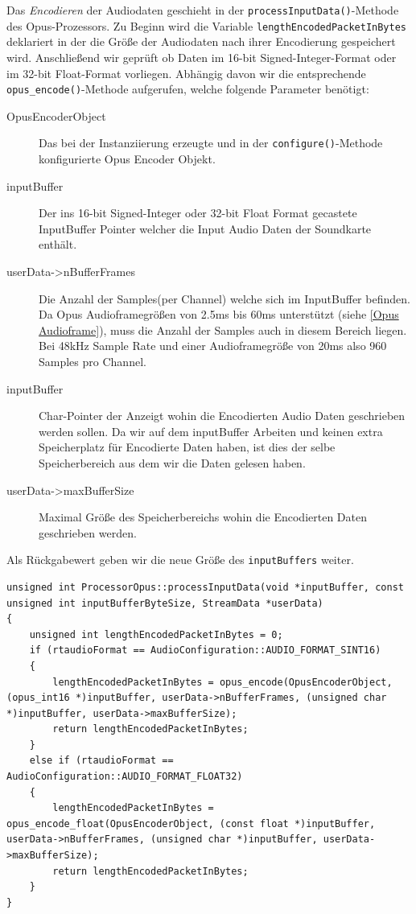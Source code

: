 Das \textit{Encodieren} der Audiodaten geschieht in der \texttt{processInputData()}-Methode des Opus-Prozessors. Zu Beginn wird die Variable \texttt{lengthEncodedPacketInBytes} deklariert in der die Größe der Audiodaten nach ihrer Encodierung gespeichert wird. Anschließend wir geprüft ob Daten im 16-bit Signed-Integer-Format oder im 32-bit Float-Format vorliegen.
Abhängig davon wir die entsprechende \texttt{opus\_encode()}-Methode aufgerufen, welche folgende Parameter benötigt:

\begin{description}
\item[OpusEncoderObject] Das bei der Instanziierung erzeugte und in der \texttt{configure()}-Methode konfigurierte Opus Encoder Objekt.
\item[inputBuffer] Der ins 16-bit Signed-Integer oder 32-bit Float Format gecastete InputBuffer Pointer welcher die Input Audio Daten der Soundkarte enthält.
\item[userData->nBufferFrames] Die Anzahl der Samples(per Channel) welche sich im InputBuffer befinden. Da Opus Audioframegrößen von 2.5ms bis 60ms unterstützt (siehe \ref{Opus Audioframe}), muss die Anzahl der Samples auch in diesem Bereich liegen. Bei 48kHz Sample Rate und einer Audioframegröße von 20ms also 960 Samples pro Channel.
\item[inputBuffer] Char-Pointer der Anzeigt wohin die Encodierten Audio Daten geschrieben werden sollen. Da wir auf dem inputBuffer Arbeiten und keinen extra Speicherplatz für Encodierte Daten haben, ist dies der selbe Speicherbereich aus dem wir die Daten gelesen haben.
\item[userData->maxBufferSize] Maximal Größe des Speicherbereichs wohin die Encodierten Daten geschrieben werden.
\end{description}

Als Rückgabewert geben wir die neue Größe des \texttt{inputBuffers} weiter. 


\begin{lstlisting}[caption={Encodieren von Audio Daten mittels Opus},label={Code:Opus Encodieren}]
unsigned int ProcessorOpus::processInputData(void *inputBuffer, const unsigned int inputBufferByteSize, StreamData *userData)
{
    unsigned int lengthEncodedPacketInBytes = 0;
    if (rtaudioFormat == AudioConfiguration::AUDIO_FORMAT_SINT16)
    {
        lengthEncodedPacketInBytes = opus_encode(OpusEncoderObject, (opus_int16 *)inputBuffer, userData->nBufferFrames, (unsigned char *)inputBuffer, userData->maxBufferSize);
        return lengthEncodedPacketInBytes;
    }
    else if (rtaudioFormat == AudioConfiguration::AUDIO_FORMAT_FLOAT32)
    {
        lengthEncodedPacketInBytes = opus_encode_float(OpusEncoderObject, (const float *)inputBuffer, userData->nBufferFrames, (unsigned char *)inputBuffer, userData->maxBufferSize);
        return lengthEncodedPacketInBytes;
    }
}
\end{lstlisting}

